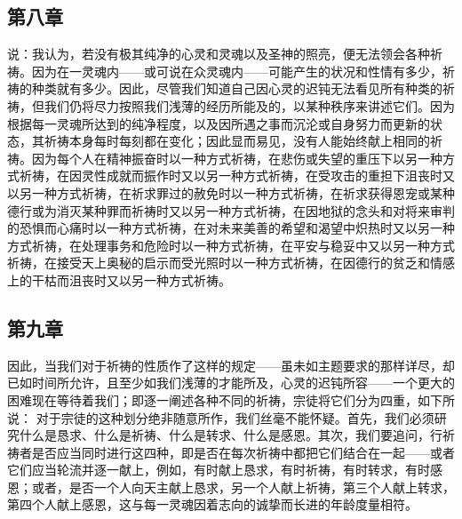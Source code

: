 
\subsection{第八章}

\par

说：我认为，若没有极其纯净的心灵和灵魂以及圣神的照亮，便无法领会各种祈祷。因为在一灵魂内——或可说在众灵魂内——可能产生的状况和性情有多少，祈祷的种类就有多少。因此，尽管我们知道自己因心灵的迟钝无法看见所有种类的祈祷，但我们仍将尽力按照我们浅薄的经历所能及的，以某种秩序来讲述它们。因为根据每一灵魂所达到的纯净程度，以及因所遇之事而沉沦或自身努力而更新的状态，其祈祷本身每时每刻都在变化；因此显而易见，没有人能始终献上相同的祈祷。因为每个人在精神振奋时以一种方式祈祷，在悲伤或失望的重压下以另一种方式祈祷，在因灵性成就而振作时又以另一种方式祈祷，在受攻击的重担下沮丧时又以另一种方式祈祷，在祈求罪过的赦免时以一种方式祈祷，在祈求获得恩宠或某种德行或为消灭某种罪而祈祷时又以另一种方式祈祷，在因地狱的念头和对将来审判的恐惧而心痛时以一种方式祈祷，在对未来美善的希望和渴望中炽热时又以另一种方式祈祷，在处理事务和危险时以一种方式祈祷，在平安与稳妥中又以另一种方式祈祷，在接受天上奥秘的启示而受光照时以一种方式祈祷，在因德行的贫乏和情感上的干枯而沮丧时又以另一种方式祈祷。\par


\subsection{第九章}

\par

因此，当我们对于祈祷的性质作了这样的规定——虽未如主题要求的那样详尽，却已如时间所允许，且至少如我们浅薄的才能所及，心灵的迟钝所容——一个更大的困难现在等待着我们；即逐一阐述各种不同的祈祷，宗徒将它们分为四重，如下所说：  对于宗徒的这种划分绝非随意所作，我们丝毫不能怀疑。首先，我们必须研究什么是恳求、什么是祈祷、什么是转求、什么是感恩。其次，我们要追问，行祈祷者是否应当同时进行这四种，即是否在每次祈祷中都把它们结合在一起——或者它们应当轮流并逐一献上，例如，有时献上恳求，有时祈祷，有时转求，有时感恩；或者，是否一个人向天主献上恳求，另一个人献上祈祷，第三个人献上转求，第四个人献上感恩，这与每一灵魂因着志向的诚挚而长进的年龄度量相符。\par

